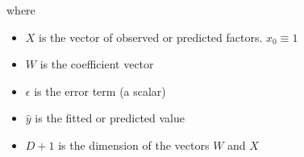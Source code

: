 \documentclass{beamer}
\begin{document}
\begin{frame}
\bigskip
where
\begin{itemize}
      \item $X$ is the vector of observed or predicted factors. $x_0\equiv1$ 
      \item $W$ is the coefficient vector
      \item $\epsilon$ is the error term (a scalar)
      \item $\hat{y}$ is the fitted or predicted value
      \item \alert{$D+1$} is the \alert{dimension} of the vectors $W$ and $X$
\end{itemize}
\end{frame}
\end{document}
